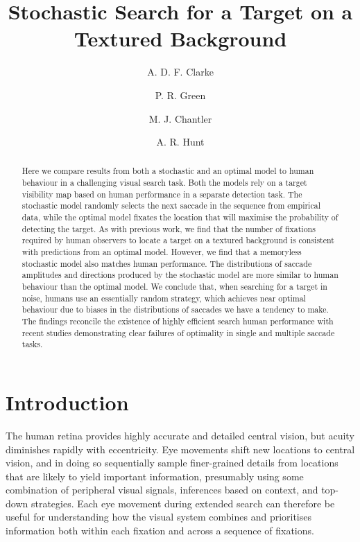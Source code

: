 \documentclass[preprint, authoryear]{elsarticle} %
\begin{document}
\title{Stochastic Search for a Target on a Textured Background}
\author[abdn]{A. D. F. Clarke}
\author[hw]{P. R. Green}
\author[hw]{M. J. Chantler}
\author[abdn]{A. R. Hunt}
\address[abdn]{School of Psychology, King's College, University of Aberdeen, Aberdeen, United Kingdom}
\address[hw]{School of Mathematical and Computer Sciences, Heriot-Watt University, Edinburgh, United Kingdom}

\begin{abstract}
Here we compare results from both a stochastic and an optimal model to human behaviour in a challenging visual search task. Both the models rely on a target visibility map based on human performance in a separate detection task. The stochastic model randomly selects the next saccade in the sequence from empirical data, while the optimal model fixates the location that will maximise the probability of detecting the target. As with previous work, we find that the number of fixations required by human observers to locate a target on a textured background is consistent with predictions from an optimal model. However, we find that a memoryless stochastic model also matches human performance. The distributions of saccade amplitudes and directions produced by the stochastic model are more similar to human behaviour than the optimal model. We conclude that, when searching for a target in noise, humans use an essentially random strategy, which achieves near optimal behaviour due to biases in the distributions of saccades we have a tendency to make. The findings reconcile the existence of highly efficient search human performance with recent studies demonstrating clear failures of optimality in single and multiple saccade tasks.
\end{abstract}

\maketitle

\section{Introduction}
The human retina provides highly accurate and detailed central vision, but acuity diminishes rapidly with eccentricity. Eye movements shift new locations to central vision, and in doing so sequentially sample finer-grained details from locations that are likely to yield important information, presumably using some combination of peripheral visual signals, inferences based on context, and top-down strategies. Each eye movement during extended search can therefore be useful for understanding how the visual system combines and prioritises information both within each fixation and across a sequence of fixations.
\end{document}
